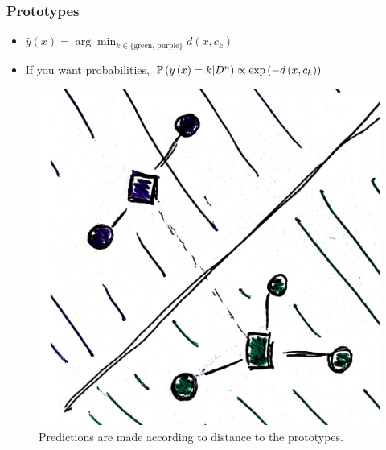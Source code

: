 \documentclass[10pt,mathserif]{beamer}
\begin{document}
\begin{frame}
  \frametitle{Prototypes}
 \begin{itemize}
 \item $\hat{y}\left(x\right) = \arg\min_{k \in \{\text{green, purple}\}} d\left(x, c_k\right)$
 \item If you want probabilities, $\mathbb{P}\left({y\left(x\right) = k \vert D^{n}}\right) \propto \operatorname{exp}\left(-d\left(x, c_k \right)\right)$
 \end{itemize} 
\begin{figure}[ht]
  \centering
  \includegraphics[width=0.35\paperwidth]{figure/prototypes_3}
  \caption{Predictions are made according to distance to the prototypes.\label{fig:prototypes_3} }
\end{figure}
\end{frame}
\end{document}
